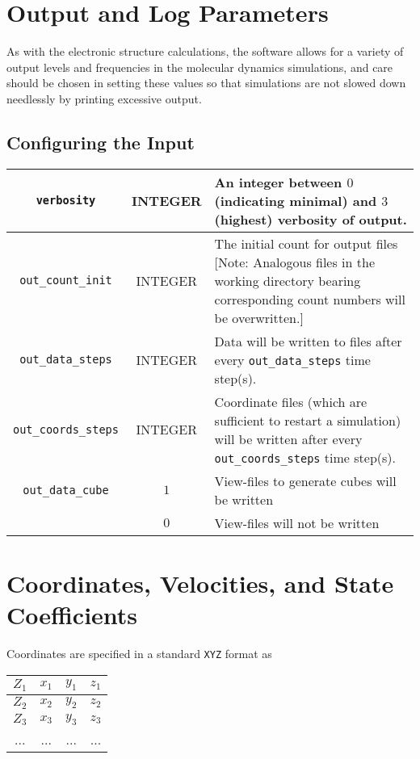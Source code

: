 \documentclass[12pt,letter,footinclude=true,headinclude=true,hyphens,oneside]{book} %
\begin{document}
    \section{Output and Log Parameters}
    
    As with the electronic structure calculations, the software allows for a variety of output levels and frequencies in the molecular dynamics simulations, and care should be chosen in setting these values so that simulations are not slowed down needlessly by printing excessive output.
    
    \subsection{Configuring the Input}
    \label{output-log-input}
    
    \begin{tabular}{ | c | c | p{7cm} | }
    \hline
    \texttt{verbosity} & INTEGER & An integer between $0$ (indicating minimal) and $3$ (highest) verbosity of output. \\ \hline
    \texttt{out\_count\_init} & INTEGER & The initial count for output files [Note: Analogous files in the working directory bearing corresponding count numbers will be overwritten.]\\ \hline
    \texttt{out\_data\_steps} & INTEGER & Data will be written to files after every \texttt{out\_data\_steps} time step(s). \\ \hline
    \texttt{out\_coords\_steps} & INTEGER & Coordinate files (which are sufficient to restart a simulation) will be written after every \texttt{out\_coords\_steps} time step(s). \\ \hline
    \texttt{out\_data\_cube} & $1$ & View-files to generate cubes will be written \\
    & $0$ & View-files will not be written \\ \hline
    \end{tabular}
   
    \section{Coordinates, Velocities, and State Coefficients}
    
    Coordinates are specified in a standard \texttt{XYZ} format as
    
    \begin{center}
    \begin{tabular}{ | c | c | c | c | } \hline
    $Z_1$ & $x_1$ & $y_1$ & $z_1$ \\ \hline
    $Z_2$ & $x_2$ & $y_2$ & $z_2$ \\ \hline
    $Z_3$ & $x_3$ & $y_3$ & $z_3$ \\ \hline
    ... & ... & ... & ... \\ \hline
    \end{tabular}
    \end{center}
    
\end{document}
